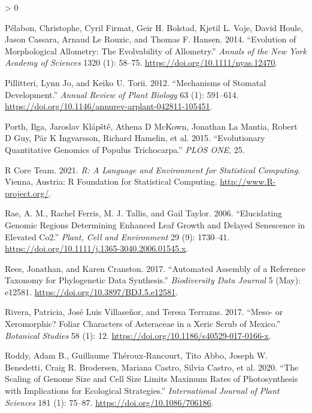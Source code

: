 \documentclass[
  10pt,
]{article}
\newlength{\cslhangindent}
\newenvironment{CSLReferences}[2] %
 {%
  \setlength{\parindent}{0pt}
  \ifodd #1 \everypar{\setlength{\hangindent}{\cslhangindent}}\ignorespaces\fi
  \ifnum #2 > 0
  \setlength{\parskip}{#2\baselineskip}
  \fi
 }%
 {}
\begin{document}
\begin{CSLReferences}{1}{0}
\leavevmode\hypertarget{ref-pelabon_evolution_2014}{}%
Pélabon, Christophe, Cyril Firmat, Geir H. Bolstad, Kjetil L. Voje, David Houle, Jason Cassara, Arnaud Le Rouzic, and Thomas F. Hansen. 2014. {``Evolution of Morphological Allometry: {The} Evolvability of Allometry.''} \emph{Annals of the New York Academy of Sciences} 1320 (1): 58--75. \url{https://doi.org/10.1111/nyas.12470}.

\leavevmode\hypertarget{ref-pillitteri_mechanisms_2012}{}%
Pillitteri, Lynn Jo, and Keiko U. Torii. 2012. {``Mechanisms of {Stomatal} {Development}.''} \emph{Annual Review of Plant Biology} 63 (1): 591--614. \url{https://doi.org/10.1146/annurev-arplant-042811-105451}.

\leavevmode\hypertarget{ref-porth_evolutionary_2015}{}%
Porth, Ilga, Jaroslav Klápště, Athena D McKown, Jonathan La Mantia, Robert D Guy, Pär K Ingvarsson, Richard Hamelin, et al. 2015. {``Evolutionary {Quantitative} {Genomics} of {Populus} Trichocarpa.''} \emph{PLOS ONE}, 25.

\leavevmode\hypertarget{ref-r_core_team_r:_2021}{}%
R Core Team. 2021. \emph{R: {A} {Language} and {Environment} for {Statistical} {Computing}}. Vienna, Austria: R Foundation for Statistical Computing. \url{http://www.R-project.org/}.

\leavevmode\hypertarget{ref-rae_elucidating_2006}{}%
Rae, A. M., Rachel Ferris, M. J. Tallis, and Gail Taylor. 2006. {``Elucidating Genomic Regions Determining Enhanced Leaf Growth and Delayed Senescence in Elevated {Co2}.''} \emph{Plant, Cell and Environment} 29 (9): 1730--41. \url{https://doi.org/10.1111/j.1365-3040.2006.01545.x}.

\leavevmode\hypertarget{ref-rees_automated_2017}{}%
Rees, Jonathan, and Karen Cranston. 2017. {``Automated Assembly of a Reference Taxonomy for Phylogenetic Data Synthesis.''} \emph{Biodiversity Data Journal} 5 (May): e12581. \url{https://doi.org/10.3897/BDJ.5.e12581}.

\leavevmode\hypertarget{ref-rivera_meso-_2017}{}%
Rivera, Patricia, José Luis Villaseñor, and Teresa Terrazas. 2017. {``Meso- or Xeromorphic? {Foliar} Characters of {Asteraceae} in a Xeric Scrub of {Mexico}.''} \emph{Botanical Studies} 58 (1): 12. \url{https://doi.org/10.1186/s40529-017-0166-x}.

\leavevmode\hypertarget{ref-roddy_scaling_2020}{}%
Roddy, Adam B., Guillaume Théroux-Rancourt, Tito Abbo, Joseph W. Benedetti, Craig R. Brodersen, Mariana Castro, Silvia Castro, et al. 2020. {``The {Scaling} of {Genome} {Size} and {Cell} {Size} {Limits} {Maximum} {Rates} of {Photosynthesis} with {Implications} for {Ecological} {Strategies}.''} \emph{International Journal of Plant Sciences} 181 (1): 75--87. \url{https://doi.org/10.1086/706186}.


\end{CSLReferences}
\end{document}
